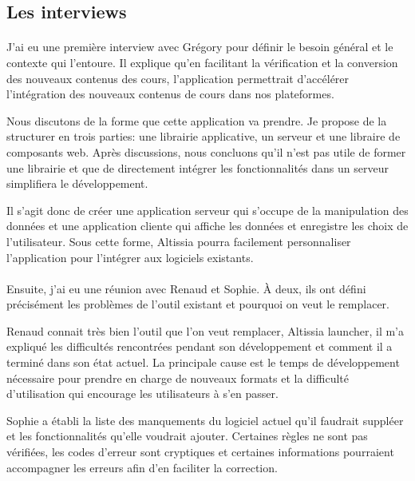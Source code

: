 \subsection{Les interviews}
\label{subsec:interviews}

\paragraph{}
J'ai eu une première interview avec Grégory pour définir le besoin général et le contexte qui l'entoure.
Il explique qu'en facilitant la vérification et la conversion des nouveaux contenus des cours, l'application permettrait d'accélérer l'intégration des nouveaux contenus de cours dans nos plateformes.

Nous discutons de la forme que cette application va prendre. 
Je propose de la structurer en trois parties: une librairie applicative, un serveur et une libraire de composants web.
Après discussions, nous concluons qu'il n'est pas utile de former une librairie et que de directement intégrer les fonctionnalités dans un serveur simplifiera le développement.

Il s'agit donc de créer une application serveur qui s'occupe de la manipulation des données et une application cliente qui affiche les données et enregistre les choix de l'utilisateur.
Sous cette forme, Altissia pourra facilement personnaliser\fnmark{} l'application pour l'intégrer aux logiciels existants.

\paragraph{}
Ensuite, j'ai eu une réunion avec Renaud et Sophie.
À deux, ils ont défini précisément les problèmes de l'outil existant et pourquoi on veut le remplacer.

Renaud connait très bien l'outil que l'on veut remplacer, Altissia launcher, il m'a expliqué les difficultés rencontrées pendant son développement et comment il a terminé dans son état actuel.
La principale cause est le temps de développement nécessaire pour prendre en charge de nouveaux formats et la difficulté d'utilisation qui encourage les utilisateurs à s'en passer.

Sophie a établi la liste des manquements du logiciel actuel qu'il faudrait suppléer et les fonctionnalités qu'elle voudrait ajouter.
Certaines règles ne sont pas vérifiées, les codes d'erreur sont cryptiques et certaines informations pourraient accompagner les erreurs afin d'en faciliter la correction.


